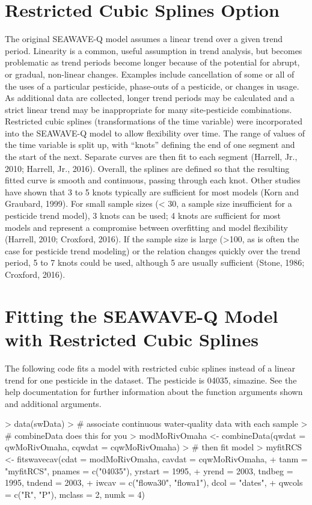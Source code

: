 \documentclass[11pt]{article}
\begin{document}
\section{Restricted Cubic Splines Option}
The original SEAWAVE-Q model assumes a linear trend over a given trend period. Linearity is a common, useful assumption in trend analysis, but becomes problematic as trend periods become longer because of the potential for abrupt, or gradual, non-linear changes. Examples include cancellation of some or all of the uses of a particular pesticide, phase-outs of a pesticide, or changes in usage. As additional data are collected, longer trend periods may be calculated and a strict linear trend may be inappropriate for many site-pesticide combinations. Restricted cubic splines (transformations of the time variable) were incorporated into the SEAWAVE-Q model to allow flexibility over time. The range of values of the time variable is split up, with “knots” defining the end of one segment and the start of the next. Separate curves are then fit to each segment (Harrell, Jr., 2010; Harrell, Jr., 2016). Overall, the splines are defined so that the resulting fitted curve is smooth and continuous, passing through each knot. Other studies have shown that 3 to 5 knots typically are sufficient for most models (Korn and Graubard, 1999). For small sample sizes (< 30, a sample size insufficient for a pesticide trend model), 3 knots can be used; 4 knots are sufficient for most models and represent a compromise between overfitting and model flexibility (Harrell, 2010; Croxford, 2016). If the sample size is large (>100, as is often the case for pesticide trend modeling) or the relation changes quickly over the trend period, 5 to 7 knots could be used, although 5 are usually sufficient (Stone, 1986; Croxford, 2016).

\section{Fitting the SEAWAVE-Q Model with Restricted Cubic Splines}

The following code fits a model with restricted cubic splines instead of a linear trend for one pesticide in the dataset.  The pesticide is 04035, simazine.  See the help documentation for further information about the function arguments shown and additional arguments.
\vspace{5 mm}

\begin{Schunk}
\begin{Sinput}
> data(swData)
> # associate continuous water-quality data with each sample
> # combineData does this for you
> modMoRivOmaha <- combineData(qwdat = qwMoRivOmaha, cqwdat = cqwMoRivOmaha)
> # then fit model
> myfitRCS <- fitswavecav(cdat = modMoRivOmaha, cavdat = cqwMoRivOmaha, 
+                         tanm = "myfitRCS", pnames = c("04035"), yrstart = 1995, 
+                         yrend = 2003, tndbeg = 1995, tndend = 2003, 
+                         iwcav = c("flowa30", "flowa1"), dcol = "dates", 
+                         qwcols = c("R", "P"), mclass = 2, numk = 4)
\end{Sinput}
\end{Schunk}
\end{document}
